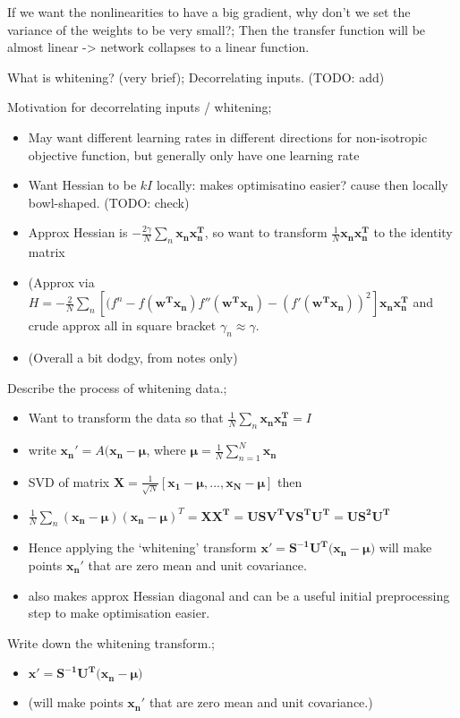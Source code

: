 \documentclass{article}
\begin{document}
If we want the nonlinearities to have a big gradient, why don't we set the variance of the weights to be very small?; Then the transfer function will be almost linear -> network collapses to a linear function.

What is whitening? (very brief); Decorrelating inputs. (TODO: add)

Motivation for decorrelating inputs / whitening; \begin{itemize}
    \item May want different learning rates in different directions for non-isotropic objective function, but generally only have one learning rate
    \item Want Hessian to be $kI$ locally: makes optimisatino easier? cause then locally bowl-shaped. (TODO: check)
    \item Approx Hessian is $-\frac{2\gamma}{N}\sum_n \mathbf{x_nx_n^T}$, so want to transform $\frac{1}{N}\mathbf{x_nx_n^T}$ to the identity matrix
    \item (Approx via $H=-\frac{2}{N}\sum_n[(f^n - f(\mathbf{w^Tx_n})f''(\mathbf{w^Tx_n}) - (f'(\mathbf{w^Tx_n}))^2]\mathbf{x_nx_n^T}$ and crude approx all in square bracket $\gamma_n \approx \gamma$.
    \item (Overall a bit dodgy, from notes only)
\end{itemize}

Describe the process of whitening data.; \begin{itemize}
    \item Want to transform the data so that $\frac{1}{N}\sum_n \mathbf{x_nx_n^T} = I$
    \item write $\mathbf{x_n}' = A(\mathbf{x_n - \mu}$, where $\mathbf{\mu}=\frac{1}{N}\sum_{n=1}^N\mathbf{x_n}$
    \item SVD of matrix $\mathbf{X}=\frac{1}{\sqrt{N}}[\mathbf{x_1 - \mu, ..., x_N - \mu}]$ then 
    \item $\frac{1}{N}\sum_n(\mathbf{x_n - \mu})(\mathbf{x_n - \mu})^T = \mathbf{XX^T = USV^TVS^TU^T = US^2U^T}$
    \item Hence applying the `whitening' transform $\mathbf{x'} = \mathbf{S^{-1}U^T(x_n - \mu})$ will make points $\mathbf{x_n}'$ that are zero mean and unit covariance.
    \item also makes approx Hessian diagonal and can be a useful initial preprocessing step to make optimisation easier.
\end{itemize}

Write down the whitening transform.; \begin{itemize}
    \item $\mathbf{x'} = \mathbf{S^{-1}U^T(x_n - \mu})$ 
    \item (will make points $\mathbf{x_n}'$ that are zero mean and unit covariance.)
\end{itemize} 

\end{document}
